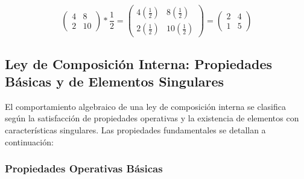 \documentclass{article}
\begin{document}
\[ \begin{pmatrix} 4 & 8 \\ 2 & 10 \end{pmatrix} \ast \frac{1}{2} = \begin{pmatrix} 4\left(\frac{1}{2}\right) & 8\left(\frac{1}{2}\right) \\ 2\left(\frac{1}{2}\right) & 10\left(\frac{1}{2}\right) \end{pmatrix} = \begin{pmatrix} 2 & 4 \\ 1 & 5 \end{pmatrix} \]

\bigskip

\subsection{Ley de Composición Interna: Propiedades Básicas y de Elementos Singulares} 
\label{sec:leyes_de_composicion_interna_propiedades}

El comportamiento algebraico de una ley de composición interna se clasifica según la satisfacción de propiedades operativas y la existencia de elementos con características singulares. Las propiedades fundamentales se detallan a continuación:
\bigskip

\subsubsection{Propiedades Operativas Básicas}
\end{document}
